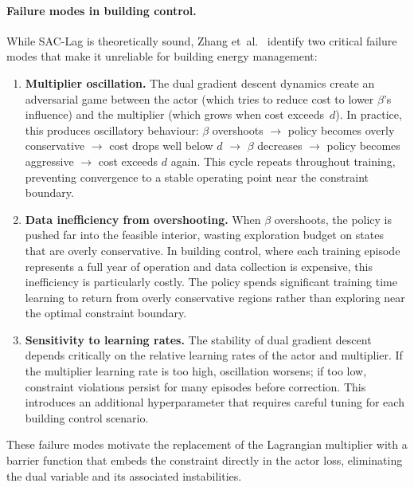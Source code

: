 \paragraph{Failure modes in building control.}
While SAC-Lag is theoretically sound, Zhang et~al.~\cite{zhang2024csaclb}
identify two critical failure modes that make it unreliable for building
energy management:

\begin{enumerate}
  \item \textbf{Multiplier oscillation.}  The dual gradient descent dynamics
    create an adversarial game between the actor (which tries to reduce cost
    to lower $\beta$'s influence) and the multiplier (which grows when cost
    exceeds~$d$).  In practice, this produces oscillatory behaviour:
    $\beta$ overshoots $\to$ policy becomes overly conservative $\to$ cost
    drops well below $d$ $\to$ $\beta$ decreases $\to$ policy becomes
    aggressive $\to$ cost exceeds $d$ again.  This cycle repeats throughout
    training, preventing convergence to a stable operating point near the
    constraint boundary.

  \item \textbf{Data inefficiency from overshooting.}  When $\beta$ overshoots,
    the policy is pushed far into the feasible interior, wasting exploration
    budget on states that are overly conservative.  In building control, where
    each training episode represents a full year of operation and data
    collection is expensive, this inefficiency is particularly costly.  The
    policy spends significant training time learning to return from overly
    conservative regions rather than exploring near the optimal constraint
    boundary.

  \item \textbf{Sensitivity to learning rates.}  The stability of dual gradient
    descent depends critically on the relative learning rates of the actor and
    multiplier.  If the multiplier learning rate is too high, oscillation
    worsens; if too low, constraint violations persist for many episodes before
    correction.  This introduces an additional hyperparameter that requires
    careful tuning for each building control scenario.
\end{enumerate}

These failure modes motivate the replacement of the Lagrangian multiplier with
a barrier function that embeds the constraint directly in the actor loss,
eliminating the dual variable and its associated instabilities.

